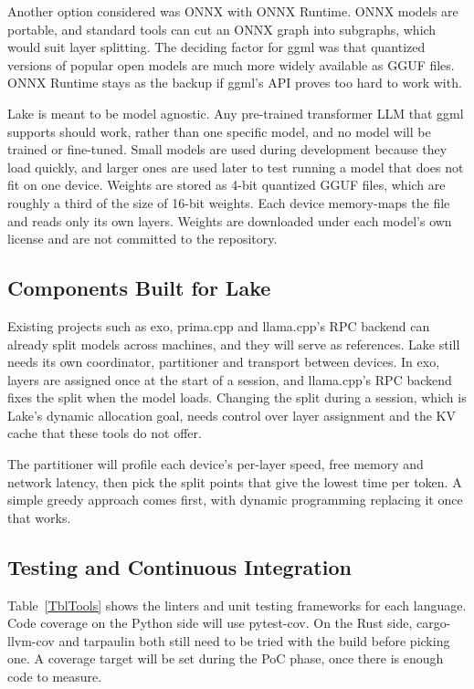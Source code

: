 \documentclass{article}
\begin{document}
Another option considered was ONNX with ONNX Runtime. ONNX models are
portable, and standard tools can cut an ONNX graph into subgraphs, which would
suit layer splitting. The deciding factor for ggml was that quantized versions of popular open
models are much more widely available as GGUF files. ONNX Runtime stays
as the backup if ggml's API proves too hard to work with.

Lake is meant to be model agnostic. Any pre-trained transformer LLM that ggml
supports should work, rather than one specific model, and no model will be
trained or fine-tuned. Small models are used during development because they
load quickly, and larger ones are used later to test running a model that does
not fit on one device. Weights are stored as 4-bit quantized GGUF files, which
are roughly a third of the size of 16-bit weights. Each device memory-maps the
file and reads only its own layers. Weights are downloaded under each model's
own license and are not committed to the repository.

\subsection{Components Built for Lake}

Existing projects such as exo, prima.cpp and llama.cpp's RPC backend can
already split models across machines, and they will serve as references. Lake
still needs its own coordinator, partitioner and transport between devices. In
exo, layers are assigned once at the start of a session, and llama.cpp's RPC
backend fixes the split when the model loads. Changing the split during a
session, which is Lake's dynamic allocation goal, needs control over layer
assignment and the KV cache that these tools do not offer.

The partitioner will profile each device's per-layer speed, free memory and
network latency, then pick the split points that give the lowest time per
token. A simple greedy approach comes first, with dynamic programming
replacing it once that works.

\subsection{Testing and Continuous Integration}

Table~\ref{TblTools} shows the linters and unit testing frameworks for each
language. Code coverage on the Python side will use pytest-cov. On the Rust
side, cargo-llvm-cov and tarpaulin both still need to be tried with the build before
picking one. A coverage target will be set during the PoC phase, once there is
enough code to measure.
\end{document}
